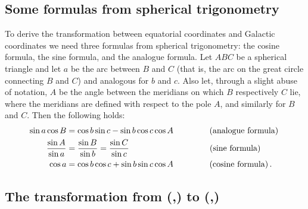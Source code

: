 \subsection{Some formulas from spherical trigonometry}

To derive the transformation between equatorial coordinates and
Galactic coordinates we need three formulas from spherical
trigonometry: the cosine formula, the sine formula, and the analogue
formula. Let $ABC$ be a spherical triangle and let $a$ be the arc
between $B$ and $C$ (that is, the arc on the great circle connecting
$B$ and $C$) and analogous for $b$ and $c$. Also let, through a slight
abuse of notation, $A$ be the angle between the meridians on which $B$
respectively $C$ lie, where the meridians are defined with respect to
the pole $A$, and similarly for $B$ and $C$. Then the following holds:
\begin{align}
\sin a \cos B & = \cos b \sin c - \sin b \cos c \cos A\, \qquad \qquad \, \textnormal{(analogue formula)}\,\label{eq:analogue}\\
\frac{\sin A}{\sin a} & = \frac{\sin B}{\sin b} = \frac{\sin C}{\sin c} \ \ \quad\qquad \qquad\qquad \qquad \textnormal{(sine formula)}\,\label{eq:sineform}\\
\cos a &= \cos b \cos c + \sin b \sin c \cos A\qquad \qquad\ \textnormal{(cosine formula)}\label{eq:cosineform}\, .
\end{align}



\subsection{The transformation from (\ra,\dec) to (\gall,\galb)}

